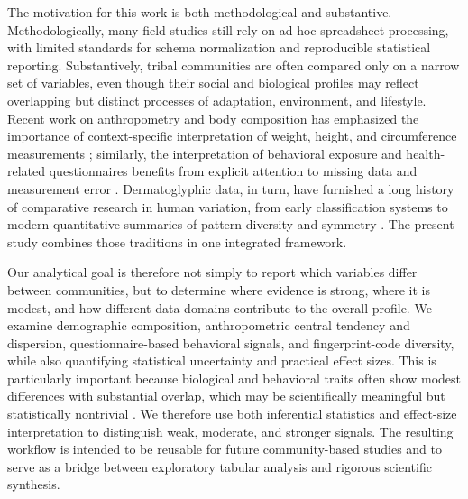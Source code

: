 \documentclass[11pt]{article}
\begin{document}
The motivation for this work is both methodological and substantive. Methodologically, many field studies still rely on ad hoc spreadsheet processing, with limited standards for schema normalization and reproducible statistical reporting. Substantively, tribal communities are often compared only on a narrow set of variables, even though their social and biological profiles may reflect overlapping but distinct processes of adaptation, environment, and lifestyle. Recent work on anthropometry and body composition has emphasized the importance of context-specific interpretation of weight, height, and circumference measurements \cite{who1995,who2000,wells2006}; similarly, the interpretation of behavioral exposure and health-related questionnaires benefits from explicit attention to missing data and measurement error \cite{rubin1976,little2002,vanbuuren2018}. Dermatoglyphic data, in turn, have furnished a long history of comparative research in human variation, from early classification systems to modern quantitative summaries of pattern diversity and symmetry \cite{galton1892,henry1900,cummins1961,holt1968}. The present study combines those traditions in one integrated framework.

Our analytical goal is therefore not simply to report which variables differ between communities, but to determine where evidence is strong, where it is modest, and how different data domains contribute to the overall profile. We examine demographic composition, anthropometric central tendency and dispersion, questionnaire-based behavioral signals, and fingerprint-code diversity, while also quantifying statistical uncertainty and practical effect sizes. This is particularly important because biological and behavioral traits often show modest differences with substantial overlap, which may be scientifically meaningful but statistically nontrivial \cite{cohen1988,cliff1993}. We therefore use both inferential statistics and effect-size interpretation to distinguish weak, moderate, and stronger signals. The resulting workflow is intended to be reusable for future community-based studies and to serve as a bridge between exploratory tabular analysis and rigorous scientific synthesis.
\end{document}
